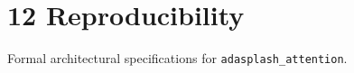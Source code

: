 \section{12 Reproducibility}

Formal architectural specifications for \texttt{adasplash_attention}.
